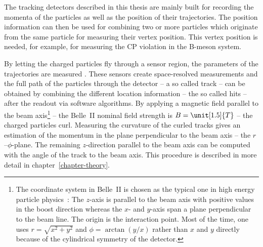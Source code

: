 The tracking detectors described in this thesis are mainly built for recording the momenta of the particles as well as the position of their trajectories. The position information can then be used for combining two or more particles which originate from the same particle for measuring their vertex position. This vertex position is needed, for example, for measuring the CP violation in the B-meson system. %

By letting the charged particles fly through a sensor region, the parameters of the trajectories are measured . These sensors create space-resolved measurements and the full path of the particles through the detector -- a so called track -- can be obtained by combining the different location information -- the so called hits -- after the readout via software algorithms. By applying a magnetic field parallel to the beam axis\footnote{The coordinate system in Belle~II is chosen as the typical one in high energy particle physics~\cite{coordinate}: The $z$-axis is parallel to the beam axis with positive values in the boost direction whereas the $x$- and $y$-axis span a plane perpendicular to the beam line. The origin is the interaction point. Most of the time, one uses $r = \sqrt{x^2 + y^2}$ and $\phi = \arctan(y/x)$ rather than $x$ and $y$ directly because of the cylindrical symmetry of the detector.} -- the Belle~II nominal field strength is $B = \unit[1.5]{T}$ -- the charged particles curl. Measuring the curvature of the curled tracks gives an estimation of the momentum in the plane perpendicular to the beam axis -- the $r$--$\phi$-plane. The remaining $z$-direction parallel to the beam axis can be computed with the angle of the track to the beam axis. This procedure is described in more detail in chapter~\ref{chapter-theory}.

